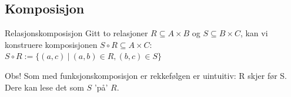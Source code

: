 \subsection{Komposisjon}

\begin{frame}{Relasjonskomposisjon}
    Gitt to relasjoner $R \subseteq A \times B$ og $S \subseteq B \times C$, kan vi konstruere komposisjonen $S \circ R \subseteq A \times C$:\\
    $S \circ R := \{(a, c) ~ | ~ (a, b) \in R, (b, c) \in S\}$
    \pause
    \begin{figure}%
        \centering
        \pause
        \qquad
        \label{fig:ros}%
    \end{figure}
    \pause
    Obs! Som med funksjonskomposisjon er rekkefølgen er uintuitiv: R skjer før S.\\
    Dere kan lese det som $S$ 'på' $R$.
\end{frame}
